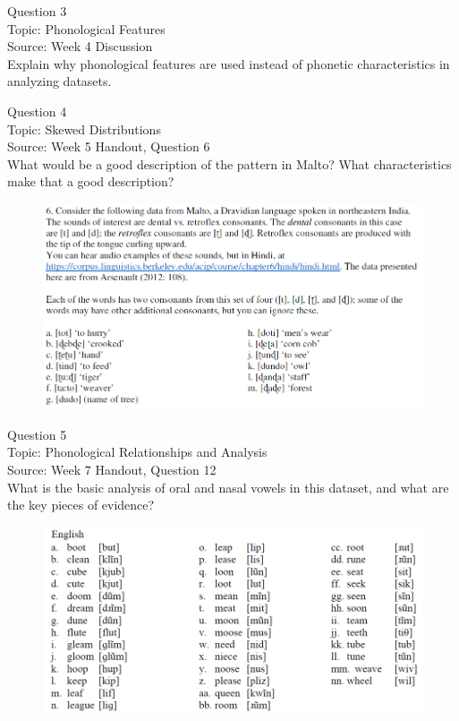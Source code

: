 \documentclass[12pt]{article}
\begin{document}
\newpage

{\large Question 3}\\

Topic: Phonological Features\\
Source: Week 4 Discussion\\

Explain why phonological features are used instead of phonetic characteristics in analyzing datasets.\\


\newpage

{\large Question 4}\\

Topic: Skewed Distributions\\
Source: Week 5 Handout, Question 6\\

What would be a good description of the pattern in Malto? What characteristics make that a good description?\\

\begin{figure}[H]
\includegraphics{../images/malto.png}
\end{figure}

\newpage

{\large Question 5}\\

Topic: Phonological Relationships and Analysis\\
Source: Week 7 Handout, Question 12\\

What is the basic analysis of oral and nasal vowels in this dataset, and what are the key pieces of evidence?\\

\begin{figure}[H]
\includegraphics{../images/english12.png}
\end{figure}
\end{document}

